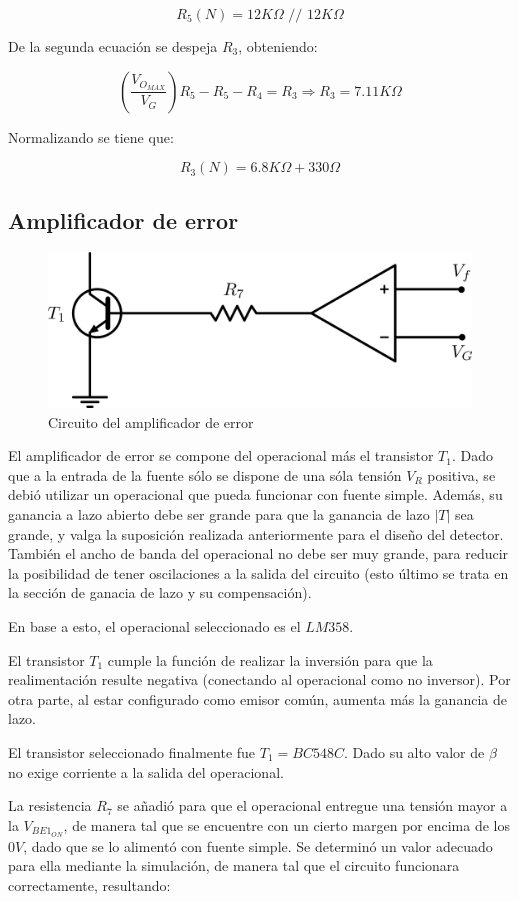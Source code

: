 $$R_5(N) = 12K\Omega \textrm{ // } 12K\Omega$$

De la segunda ecuaci\'on se despeja $R_3$, obteniendo:

$$\left(\frac{V_{O_{MAX}}}{V_G}\right)R_5 - R_5 - R_4 = R_3 \Longrightarrow R_3 = 7.11K\Omega$$

Normalizando se tiene que: 

$$R_3(N) = 6.8K\Omega + 330\Omega$$


\subsection{Amplificador de error}

\begin{figure}[!h]
\begin{centering}
\includegraphics[scale=0.5]{Imagenes/CircuitoError.png}
\par\end{centering}
\caption{Circuito del amplificador de error}

\end{figure}


El amplificador de error se compone del operacional m\'as el transistor $T_1$. Dado que a la entrada de la fuente s\'olo se dispone de una s\'ola tensi\'on $V_R$ positiva, se debi\'o utilizar un operacional que pueda funcionar con fuente simple. Adem\'as, su ganancia a lazo abierto debe ser grande para que la ganancia de lazo $|T|$ sea grande, y valga la suposici\'on realizada anteriormente para el diseño del detector. Tambi\'en el ancho de banda del operacional no debe ser muy grande, para reducir la posibilidad de tener oscilaciones a la salida del circuito (esto \'ultimo se trata en la secci\'on de ganacia de lazo y su compensaci\'on).\par
En base a esto, el operacional seleccionado es el $LM358$.\par
El transistor $T_1$ cumple la funci\'on de realizar la inversi\'on para que la realimentaci\'on resulte negativa (conectando al operacional como no inversor). Por otra parte, al estar configurado como emisor com\'un, aumenta m\'as la ganancia de lazo. \par
El transistor seleccionado finalmente fue $T_1 = BC548C$. Dado su alto valor de $\beta$ no exige corriente a la salida del operacional.\par
La resistencia $R_7$ se añadi\'o para que el operacional entregue una tensi\'on mayor a la $V_{BE1_{ON}}$, de manera tal que se encuentre con un cierto margen por encima de los $0V$, dado que se lo aliment\'o con fuente simple. Se determin\'o un valor adecuado para ella mediante la simulaci\'on, de manera tal que el circuito funcionara correctamente, resultando: 

